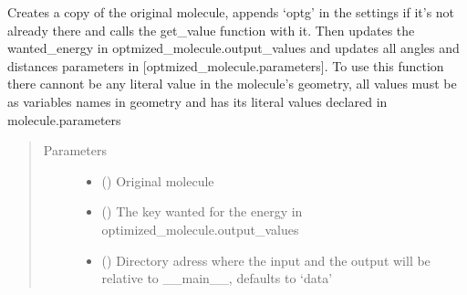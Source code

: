 \documentclass[letterpaper,10pt,english]{sphinxmanual}
\begin{document}

\begin{fulllineitems}
\label{\detokenize{MolOpt.molecular:MolOpt.molecular.molecular.optg}}
\sphinxAtStartPar
Creates a copy of the original molecule, appends ‘optg’ in the settings if it’s not already there and calls the 
get\_value function with it. Then updates the wanted\_energy in optmized\_molecule.output\_values and updates all angles
and distances parameters in {[}optmized\_molecule.parameters{]}. To use this function there cannont be any literal value 
in the molecule’s geometry, all values must be as variables names in geometry and has its literal values declared in
molecule.parameters
\begin{quote}\begin{description}
\item[{Parameters}] \leavevmode\begin{itemize}
\item {} 
\sphinxAtStartPar
{} ({\hyperref[\detokenize{MolOpt.molecular:MolOpt.molecular.molecular.Molecule}]{}}) \textendash{} Original molecule

\item {} 
\sphinxAtStartPar
{} () \textendash{} The key wanted for the energy in optimized\_molecule.output\_values

\item {} 
\sphinxAtStartPar
{} (\sphinxstyleliteralemphasis{\sphinxupquote{, }}) \textendash{} Directory adress where the input and the output will be relative to \_\_main\_\_, defaults to ‘data’


\end{itemize}
\end{description}
\end{quote}
\end{fulllineitems}
\end{document}
